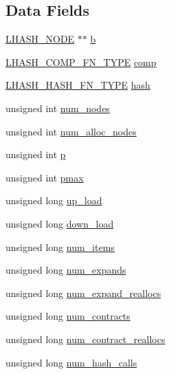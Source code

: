 \subsection*{Data Fields}
\begin{DoxyCompactItemize}
\item 
\hyperlink{crypto_2lhash_2lhash_8h_a4cb6e6cd8268a5c7eb48430fc9344c89}{L\+H\+A\+S\+H\+\_\+\+N\+O\+DE} $\ast$$\ast$ \hyperlink{structlhash__st_ad344de66a1feec7e15243d1ddfd46e1d}{b}
\item 
\hyperlink{include_2openssl_2lhash_8h_ac07b8095350f4c1c977c5d9ef576c409}{L\+H\+A\+S\+H\+\_\+\+C\+O\+M\+P\+\_\+\+F\+N\+\_\+\+T\+Y\+PE} \hyperlink{structlhash__st_a1aefa598e71ac2fa7bfc55bfbe5ce4b1}{comp}
\item 
\hyperlink{include_2openssl_2lhash_8h_a114ffb53d72638b28333462feb63226e}{L\+H\+A\+S\+H\+\_\+\+H\+A\+S\+H\+\_\+\+F\+N\+\_\+\+T\+Y\+PE} \hyperlink{structlhash__st_abb5277d75bed035d42fbb555426aa608}{hash}
\item 
unsigned int \hyperlink{structlhash__st_a19f9fccebb24ffbc3580ea2a78a8a424}{num\+\_\+nodes}
\item 
unsigned int \hyperlink{structlhash__st_a99138a02e6ed3f01c2188bb7b9290f96}{num\+\_\+alloc\+\_\+nodes}
\item 
unsigned int \hyperlink{structlhash__st_a792fef4919ad545581902926c8d43b60}{p}
\item 
unsigned int \hyperlink{structlhash__st_aed5536597c4b46cd24788dffbb241be4}{pmax}
\item 
unsigned long \hyperlink{structlhash__st_ab4cc33b9893cacee3efa0d1866355fcc}{up\+\_\+load}
\item 
unsigned long \hyperlink{structlhash__st_af342bea2eab7af190f152dcfcd412e73}{down\+\_\+load}
\item 
unsigned long \hyperlink{structlhash__st_acfc6ca6371aaf31bb1519bab7c790302}{num\+\_\+items}
\item 
unsigned long \hyperlink{structlhash__st_ac35d230ec4b8848866af3f5345d7f605}{num\+\_\+expands}
\item 
unsigned long \hyperlink{structlhash__st_a994f967c6f54f744b1b2b6adcd6ae4dc}{num\+\_\+expand\+\_\+reallocs}
\item 
unsigned long \hyperlink{structlhash__st_ab89d397a284a3c2ce3d02d949da8700f}{num\+\_\+contracts}
\item 
unsigned long \hyperlink{structlhash__st_a9295a6e4b1536d97e6efa8bb0e8adf54}{num\+\_\+contract\+\_\+reallocs}
\item 
unsigned long \hyperlink{structlhash__st_a799e297b72d77b6216fa782e586b82b5}{num\+\_\+hash\+\_\+calls}
$$
\end{DoxyCompactItemize}
